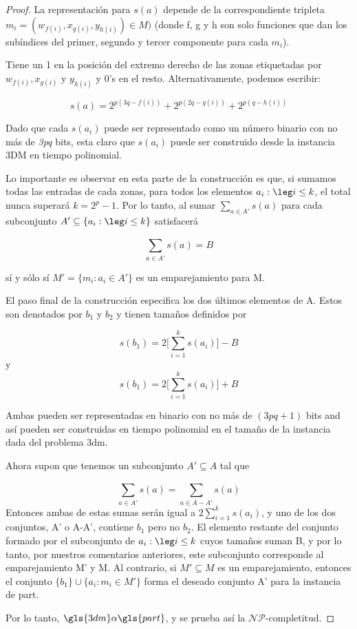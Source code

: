 \documentclass[11pt, a4paper]{memoir}
\begin{document}
\begin{proof}
La representación para $s(a)$ depende de la correspondiente tripleta $m_i = (w_{f(i)}, x_{g(i)}, y_{h(i)} )\in M)$ (donde f, g y h son solo funciones que dan los subíndices del primer, segundo y tercer componente para cada $m_i$). \par 
Tiene un 1 en la posición del extremo derecho de las zonas etiquetadas por $w_{f(i)}, x_{g(i)}$ y $y_{h(i)}$ y 0's en el resto. Alternativamente, podemos escribir: \par 

\[s(a) = 2^{p(3q-f(i))} + 2^{p(2q-g(i))} + 2^{p(q-h(i))}\]

Dado que cada $s(a_i)$ puede ser representado como un número binario con no más de \textit{3pq} bits, esta claro que $s(a_i)$ puede ser construido desde la instancia 3DM en tiempo polinomial. \par 

Lo importante es observar en esta parte de la construcción es que, si sumamos todas las entradas de cada zonas, para todos los elementos \({a_i:\leg i\leq k}\), el total nunca superará \(k=2^p-1\). Por lo tanto, al sumar \(\sum_{a \in A'}^{} s(a)\) para cada subconjunto \(A'\subseteq\{a_i:\leg i\leq k\}\) satisfacerá

\[\sum_{a \in A'}^{} s(a) = B\]

sí y sólo sí \(M'= \{m_i:a_i\in A'\}\) es un emparejamiento para M. \par 
El paso final de la construcción especifica los dos últimos elementos de A. Estos son denotados por $b_1$ y $b_2$ y tienen tamaños definidos por

\[s(b_1) = 2 \Big[\sum_{i=1}^{k} s(a_i)\Big] - B\]
y
\[s(b_1) = 2 \Big[\sum_{i=1}^{k} s(a_i)\Big] + B\]
\newpage

Ambas pueden ser representadas en binario con no más de \((3pq+1)\) bits and así pueden ser construidas en tiempo polinomial en el tamaño de la instancia dada del problema \gls{3dm}. \par 

Ahora supon que tenemos un subconjunto \(A'\subseteq A\) tal que

\[\sum_{a \in A'}^{} s(a) = \sum_{a \in A-A'}^{} s(a)\]
Entonces ambas de estas sumas serán igual a \(2\sum_{i=1}^{k} s(a_i)\), y uno de los dos conjuntos, A' o A-A', contiene $b_1$ pero no $b_2$. El elemento restante del conjunto formado por el subconjunto de \({a_i:\leg i\leq k}\) cuyos tamaños suman B, y por lo tanto, por nuestros comentarios anteriores, este subconjunto corresponde al emparejamiento M' y M. Al contrario, si \(M'\subseteq M\) es un emparejamiento, entonces el conjunto \(\{b_1\} \cup \{a_i:m_i\in M'\}\) forma el deseado conjunto A' para la instancia de \gls{part}. \par

Por lo tanto, \(\gls{3dm} \alpha \gls{part}\), y se prueba así la $\mathcal{NP}$-completitud.

\end{proof}

\printglossary[type=\acronymtype]
\end{document}
